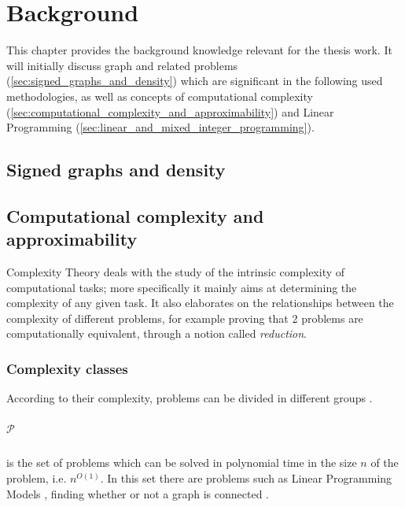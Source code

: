 \chapter{Background}
\label{ch:background}

This chapter provides the background knowledge relevant for the thesis work. It
will initially discuss graph and related problems (\autoref{sec:signed_graphs_and_density}) which are significant in the
following used methodologies, as well as concepts of computational complexity
(\autoref{sec:computational_complexity_and_approximability}) and Linear
Programming (\autoref{sec:linear_and_mixed_integer_programming}).

\section{Signed graphs and density}%
\label{sec:signed_graphs_and_density}

\section{Computational complexity and \\approximability}%
\label{sec:computational_complexity_and_approximability}

Complexity Theory deals with the study of the intrinsic complexity of
computational tasks; more specifically it mainly aims at determining the
complexity of any given task. It also elaborates on the relationships between
the complexity of different problems, for example proving that 2 problems are
computationally equivalent\cite{9780521884730}, through a notion called
\emph{reduction}.

\subsection{Complexity classes}%
\label{par:complexity_classes}

According to their complexity, problems can be divided in different groups
\cite{DemaineFall2014}.

\paragraph{$\mathcal{P} $}%
\label{par:p}
is the set of problems which can be solved in polynomial time in the size $n$ of
the problem, i.e. $n^{O(1)} $. In this set there are problems such as Linear
Programming Models \cite{KHACHIYAN198053}\cite{Karmarkar1984}, finding whether
or not a graph is connected \cite{9780521884730}.

